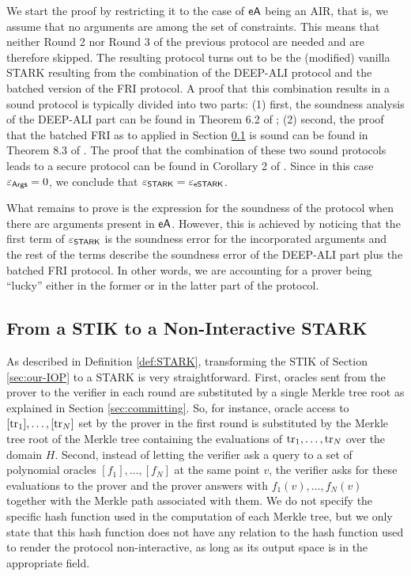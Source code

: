 \begin{proofs}
We start the proof by restricting it to the case of $\textsf{eA}$ being an AIR, that is, we assume that no arguments are among the set of constraints. This means that neither Round 2 nor Round 3 of the previous protocol are needed and are therefore skipped. The resulting protocol turns out to be the (modified) vanilla STARK resulting from the combination of the DEEP-ALI protocol and the batched version of the FRI protocol. A proof that this combination results in a sound protocol is typically divided into two parts: (1) first, the soundness analysis of the DEEP-ALI part can be found in Theorem 6.2 of \cite{EPRINT:BGKS19}; (2) second, the proof that the batched FRI as to applied in Section \ref{sec:STIK-to-STARK} is sound can be found in Theorem 8.3 of \cite{EPRINT:BCIKS20}. The proof that the combination of these two sound protocols leads to a secure protocol can be found in Corollary 2 of \cite{EPRINT:StarkWare21}. Since in this case $\varepsilon_{\textsf{Args}} = 0$, we conclude that $\varepsilon_{\textsf{STARK}} = \varepsilon_{\textsf{eSTARK}}$.

What remains to prove is the expression for the soundness of the protocol when there are arguments present in $\textsf{eA}$. However, this is achieved by noticing that the first term of $\varepsilon_{\textsf{STARK}}$ is the soundness error for the incorporated arguments and the rest of the terms describe the soundness error of the DEEP-ALI part plus the batched FRI protocol. In other words, we are accounting for a prover being ``lucky'' either in the former or in the latter part of the protocol.
\end{proofs}

\fi

\subsection{From a STIK to a Non-Interactive STARK}\label{sec:STIK-to-STARK}

As described in Definition \ref{def:STARK}, transforming the STIK of Section \ref{sec:our-IOP} to a STARK is very straightforward. First, oracles sent from the prover to the verifier in each round are substituted by a single Merkle tree root as explained in Section \ref{sec:committing}. So, for instance, oracle access to $[\text{tr}_1],\dots,[\text{tr}_N]$ set by the prover in the first round is substituted by the Merkle tree root of the Merkle tree containing the evaluations of $\text{tr}_1,\dots,\text{tr}_N$ over the domain $H$. Second, instead of letting the verifier ask a query to a set of polynomial oracles $[f_1],\dots,[f_N]$ at the same point $v$, the verifier asks for these evaluations to the prover and the prover answers with $f_1(v),\dots,f_N(v)$ together with the Merkle path associated with them. We do not specify the specific hash function used in the computation of each Merkle tree, but we only state that this hash function does not have any relation to the hash function used to render the protocol non-interactive, as long as its output space is in the appropriate field.

